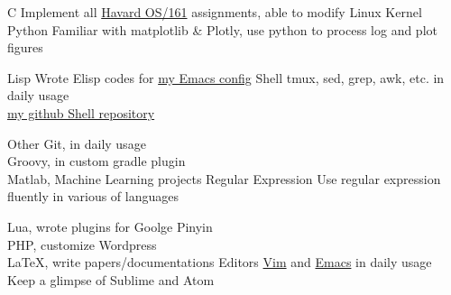 \cvcomputer
{C}{
  Implement all \href{http://www.eecs.harvard.edu/~syrah/os161/}{Havard OS/161} assignments,
  able to modify Linux Kernel
}
{Python}{
  Familiar with matplotlib \& Plotly, use python to process log and plot figures
}

\cvcomputer
{Lisp}{
  Wrote Elisp codes for \href{https://github.com/xcv58/Emacs_config}{my Emacs config}
}
{Shell}{
  tmux, sed, grep, awk, etc. in daily usage\\
  \href{https://github.com/xcv58/Shell_script}{my github Shell repository}
}

\cvcomputer
{Other}{
  Git, in daily usage\\
  Groovy, in custom gradle plugin\\
  Matlab, Machine Learning projects
}
{Regular Expression}{
  Use regular expression fluently in various of languages
}

\cvcomputer
{}{
  Lua, wrote plugins for Goolge Pinyin\\
  PHP, customize Wordpress\\
  {\LaTeX}, write papers/documentations
}
{Editors}{
  \href{https://github.com/xcv58/Vim_config}{Vim} and
  \href{https://github.com/xcv58/Emacs_config}{Emacs} in daily usage\\
  Keep a glimpse of Sublime and Atom
}
